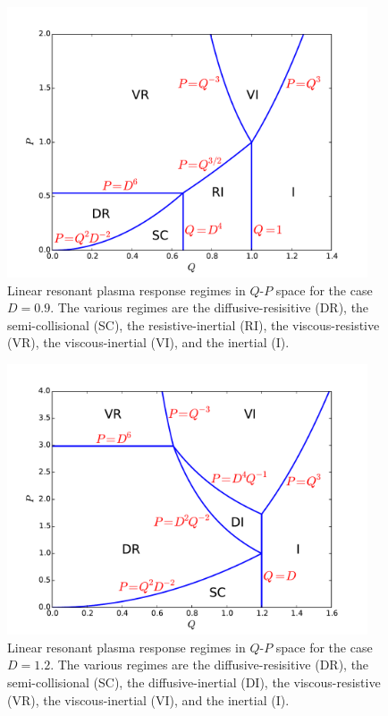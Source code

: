\documentclass[12pt,prb,aps]{revtex4-1}
\begin{document}
\newpage 
\begin{figure}
\centerline{\includegraphics[width=0.95\textwidth]{RegimeI.pdf}}
\caption{Linear resonant plasma response regimes in $Q$-$P$ space for the case $D=0.9$. The various regimes are
the diffusive-resisitive (DR), the semi-collisional (SC), the resistive-inertial (RI), the viscous-resistive (VR), the viscous-inertial
(VI), and the inertial (I).}\label{f1}
\end{figure}

\begin{figure}
\centerline{\includegraphics[width=0.95\textwidth]{RegimeII.pdf}}
\caption{Linear resonant plasma response regimes in $Q$-$P$ space for the case $D=1.2$. The various regimes are
the diffusive-resisitive (DR), the semi-collisional (SC), the diffusive-inertial (DI), the viscous-resistive (VR), the viscous-inertial
(VI), and the inertial (I).}\label{f2}
\end{figure}
\end{document}
